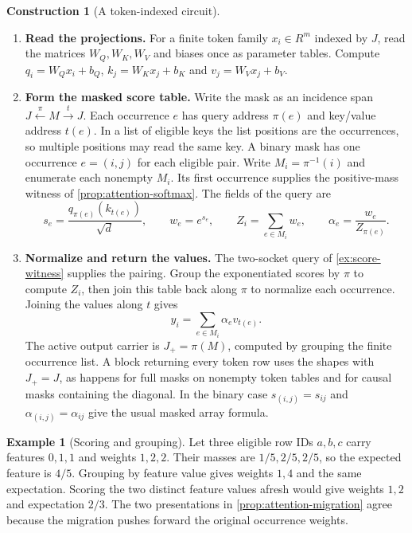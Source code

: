 \documentclass[11pt,a4paper]{article}
\theoremstyle{definition}
\newtheorem{construction}[construction]{Construction}
\newtheorem{example}[example]{Example}
\theoremstyle{remark}\newaliascnt{remark}{theorem}
\numberwithin{equation}{section}
\begin{document}
\begin{construction}[A token-indexed circuit]\label{con:head}\leavevmode
\begin{enumerate}[titledsteps]
    \item \textbf{Read the projections.} For a finite token family $x_i\in R^m$ indexed by $J$, read the matrices $W_Q,W_K,W_V$ and biases once as parameter tables. Compute $q_i=W_Qx_i+b_Q$, $k_j=W_Kx_j+b_K$ and $v_j=W_Vx_j+b_V$. 
    \item \textbf{Form the masked score table.} Write the mask as an incidence span $J\xleftarrow{\pi}M\xrightarrow{t}J$. Each occurrence $e$ has query address $\pi(e)$ and key/value address $t(e)$. In a list of eligible keys the list positions are the occurrences, so multiple positions may read the same key. A binary mask has one occurrence $e=(i,j)$ for each eligible pair. Write $M_i=\pi^{-1}(i)$ and enumerate each nonempty $M_i$. Its first occurrence supplies the positive-mass witness of \cref{prop:attention-softmax}. The fields of the query are
\[
 s_e=\frac{q_{\pi(e)}(k_{t(e)})}{\sqrt d},\qquad w_e=e^{s_e},\qquad
 Z_i=\sum_{e\in M_i}w_e,\qquad \alpha_e=\frac{w_e}{Z_{\pi(e)}} .
\]

    \item \textbf{Normalize and return the values.} The two-socket query of \cref{ex:score-witness} supplies the pairing. Group the exponentiated scores by $\pi$ to compute $Z_i$, then join this table back along $\pi$ to normalize each occurrence. Joining the values along $t$ gives
\[
 y_i=\sum_{e\in M_i}\alpha_e v_{t(e)} .
\]
The active output carrier is $J_+=\pi(M)$, computed by grouping the finite occurrence list. A block returning every token row uses the shapes with $J_+=J$, as happens for full masks on nonempty token tables and for causal masks containing the diagonal. In the binary case $s_{(i,j)}=s_{ij}$ and $\alpha_{(i,j)}=\alpha_{ij}$ give the usual masked array formula.

\end{enumerate}
\end{construction}
\begin{example}[Scoring and grouping]\label{ex:group}
Let three eligible row IDs $a,b,c$ carry features $0,1,1$ and weights $1,2,2$. Their masses are $1/5,2/5,2/5$, so the expected feature is $4/5$. Grouping by feature value gives weights $1,4$ and the same expectation. Scoring the two distinct feature values afresh would give weights $1,2$ and expectation $2/3$. The two presentations in \cref{prop:attention-migration} agree because the migration pushes forward the original occurrence weights.
\end{example}
\end{document}
